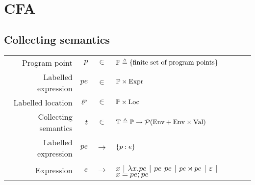 \section{CFA}
\subsection{Collecting semantics}
\begin{center}
  \begin{tabular}{rrcl}
    Program point        & $p$                & $\in$         & $\mathbb{P}\triangleq\{\textnormal{finite set of program points}\}$                            \\
    Labelled expression  & $pe$               & $\in$         & $\mathbb{P}\times\textnormal{Expr}$                                                                        \\
    Labelled location    & ${\ell}^{p}$ & $\in$         & $\mathbb{P}\times\textnormal{Loc}$                                                                         \\
    Collecting semantics & $t$                & $\in$         & $\mathbb{T}\triangleq\mathbb{P}\rightarrow\mathcal{P}({\textnormal{Env}+\textnormal{Env}\times\textnormal{Val}})$                        \\
    Labelled expression  & $pe$               & $\rightarrow$ & $\{{p}:{e}\}$                                                                                \\
    Expression           & $e$                & $\rightarrow$ & $x$ | $\lambda x.pe$ | $pe$ $pe$ | ${pe}\rtimes{pe}$ | $\varepsilon$ | $x\:\texttt{=}\:pe;pe$
  \end{tabular}
\end{center}
